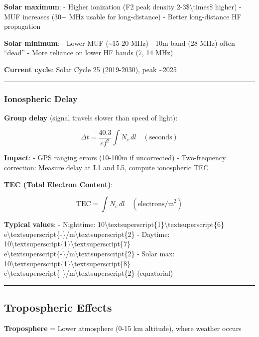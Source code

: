 \textbf{Solar maximum}: - Higher ionization (F2 peak density
2-3\$\textbackslash times\$ higher) - MUF increases (30+ MHz usable for
long-distance) - Better long-distance HF propagation

\textbf{Solar minimum}: - Lower MUF (\textasciitilde15-20 MHz) - 10m
band (28 MHz) often ``dead'' - More reliance on lower HF bands (7, 14
MHz)

\textbf{Current cycle}: Solar Cycle 25 (2019-2030), peak
\textasciitilde2025

\begin{center}\rule{0.5\linewidth}{0.5pt}\end{center}

\subsubsection{Ionospheric Delay}\label{ionospheric-delay}

\textbf{Group delay} (signal travels slower than speed of light):

\[
\Delta t = \frac{40.3}{c f^2} \int N_e \, dl \quad (\text{seconds})
\]

\textbf{Impact}: - GPS ranging errors (10-100m if uncorrected) -
Two-frequency correction: Measure delay at L1 and L5, compute
ionospheric TEC

\textbf{TEC (Total Electron Content)}:

\[
\text{TEC} = \int N_e \, dl \quad (\text{electrons/m}^2)
\]

\textbf{Typical values}: - Nighttime:
10\textbackslash textsuperscript\{1\}\textbackslash textsuperscript\{6\}
e\textbackslash textsuperscript\{-\}/m\textbackslash textsuperscript\{2\}
- Daytime:
10\textbackslash textsuperscript\{1\}\textbackslash textsuperscript\{7\}
e\textbackslash textsuperscript\{-\}/m\textbackslash textsuperscript\{2\}
- Solar max:
10\textbackslash textsuperscript\{1\}\textbackslash textsuperscript\{8\}
e\textbackslash textsuperscript\{-\}/m\textbackslash textsuperscript\{2\}
(equatorial)

\begin{center}\rule{0.5\linewidth}{0.5pt}\end{center}

\subsection{Tropospheric Effects}\label{tropospheric-effects}

\textbf{Troposphere} = Lower atmosphere (0-15 km altitude), where
weather occurs

